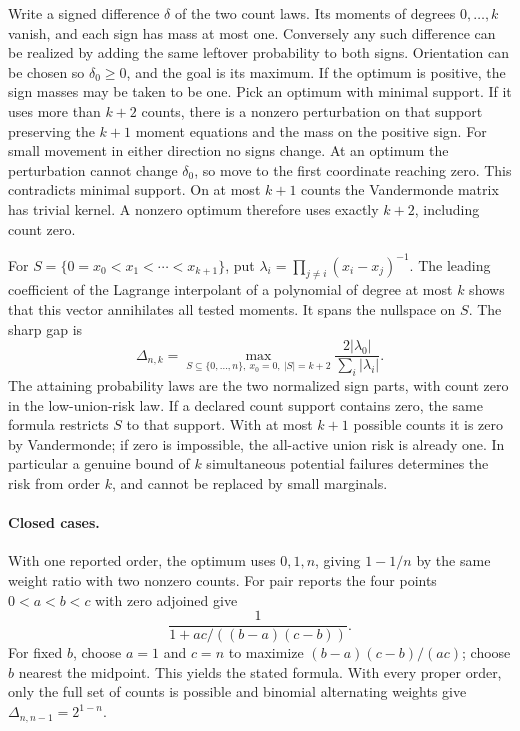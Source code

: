 \documentclass{article}
\begin{document}
Write a signed difference \(\delta\) of the two count laws.
Its moments of degrees \(0,\ldots,k\) vanish, and each sign
has mass at most one. Conversely any such difference can be
realized by adding the same leftover probability to both signs.
Orientation can be chosen so \(\delta_0\ge 0\), and the goal
is its maximum. If the optimum is positive, the sign masses
may be taken to be one. Pick an optimum with minimal support.
If it uses more than \(k+2\) counts, there is a nonzero
perturbation on that support preserving the \(k+1\) moment
equations and the mass on the positive sign. For small movement
in either direction no signs change. At an optimum the
perturbation cannot change \(\delta_0\), so move to the first
coordinate reaching zero. This contradicts minimal support.
On at most \(k+1\) counts the Vandermonde matrix has trivial
kernel. A nonzero optimum therefore uses exactly \(k+2\),
including count zero.

For \(S=\{0=x_0<x_1<\cdots<x_{k+1}\}\), put
\(\lambda_i=\prod_{j\ne i}(x_i-x_j)^{-1}\). The leading
coefficient of the Lagrange interpolant of a polynomial of degree
at most \(k\) shows that this vector annihilates all tested
moments. It spans the nullspace on \(S\). The sharp gap is
\[
 \Delta_{n,k}=\max_{S\subseteq\{0,\ldots,n\},~x_0=0,~|S|=k+2}
 \frac{2|\lambda_0|}{\sum_i|\lambda_i|}.
\]
The attaining probability laws are the two normalized sign
parts, with count zero in the low-union-risk law. If a declared
count support contains zero, the same formula restricts
\(S\) to that support. With at most \(k+1\) possible counts it
is zero by Vandermonde; if zero is impossible, the all-active
union risk is already one. In particular a genuine bound of
\(k\) simultaneous potential failures determines the risk
from order \(k\), and cannot be replaced by small marginals.

\paragraph{Closed cases.}
With one reported order, the optimum uses \(0,1,n\), giving
\(1-1/n\) by the same weight ratio with two nonzero counts.
For pair reports the four points \(0<a<b<c\) with zero
adjoined give
\[
 \frac{1}{1+ac/((b-a)(c-b))}.
\]
For fixed \(b\), choose \(a=1\) and \(c=n\) to maximize
\((b-a)(c-b)/(ac)\); choose \(b\) nearest the midpoint.
This yields the stated formula. With every proper order,
only the full set of counts is possible and binomial
alternating weights give \(\Delta_{n,n-1}=2^{1-n}\).
\end{document}
